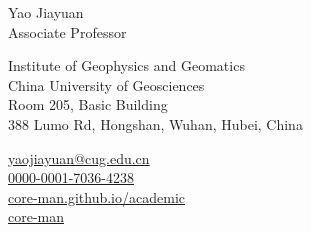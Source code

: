 \documentclass[11pt,a4paper]{article}
\makeatletter
\newcommand{\Name}{Yao Jiayuan}
\newcommand{\Role}{Associate Professor}
\newcommand{\Email}{yaojiayuan@cug.edu.cn}
\newcommand{\Website}{core-man.github.io/academic}
\newcommand{\Github}{core-man}
\newcommand{\Orcid}{0000-0001-7036-4238}
\newcommand{\Affiliation}{Institute of Geophysics and Geomatics \\ China University of Geosciences}
\newcommand{\Address}{Room 205, Basic Building \\ 388 Lumo Rd, Hongshan, Wuhan, Hubei, China}
\makeatother
\begin{document}
\thispagestyle{empty} %
{
\begin{center}
{\fontsize{24pt}{0}\selectfont \Name \hspace{1ex}} \\[0.4cm]
{\fontsize{16pt}{0}\selectfont \Role} \\[0.2cm]
\end{center}
\begin{minipage}[t]{0.6\textwidth}
  \fontsize{12pt}{15pt}\selectfont
  \Affiliation
  \\
  \Address
\end{minipage}
\begin{minipage}[t]{0.4\textwidth}
  \fontsize{12pt}{15pt}\selectfont
  \begin{flushleft}
    \faEnvelope \href{mailto:\Email}{\Email}
	\\
	\faOrcid \href{https://orcid.org/\Orcid}{\Orcid}
	\\
    \faGlobe \href{https://\Website}{\Website}
	\\
	\faGithub \href{https://github.com/\Github}{\Github}
  \end{flushleft}
\end{minipage}
}
\vspace{0.2cm}














\end{document}
